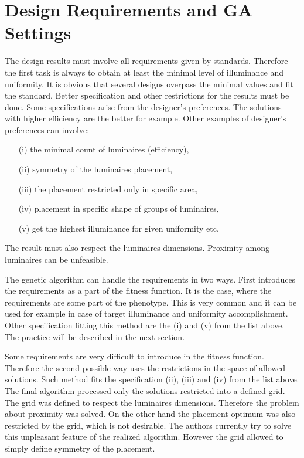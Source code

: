 \section{Design Requirements and GA Settings}
The design results must involve all requirements given by standards. Therefore the first task is always to obtain at least the minimal level of illuminance and uniformity. It is obvious that several designs overpass the minimal values and fit the standard. Better specification and other restrictions for the results must be done. Some specifications arise from the designer's preferences. The solutions with higher efficiency are the better for example. Other examples of designer's preferences can involve:

\begin{enumerate}
	\item[(i)] the minimal count of luminaires (efficiency),
	\item[(ii)] symmetry of the luminaires placement,
	\item[(iii)] the placement restricted only in specific area,
	\item[(iv)] placement in specific shape of groups of luminaires,
	\item[(v)] get the highest illuminance for given uniformity etc.
\end{enumerate}

The result must also respect the luminaires dimensions. Proximity among luminaires can be unfeasible.

The genetic algorithm can handle the requirements in two ways. First introduces the requirements as a part of the fitness function. It is the case, where the requirements are some part of the phenotype. This is very common and it can be used for example in case of target illuminance and uniformity accomplishment. Other specification fitting this method are the (i) and (v) from the list above. The practice will be described in the next section. 

Some requirements are very difficult to introduce in the fitness function. Therefore the second possible way uses the restrictions in the space of allowed solutions. Such method fits the specification (ii), (iii) and (iv) from the list above. The final algorithm processed only the solutions restricted into a defined grid. The grid was defined to respect the luminaires dimensions. Therefore the problem about proximity was solved. On the other hand the placement optimum was also restricted by the grid, which is not desirable. The authors currently try to solve this unpleasant feature of the realized algorithm. However the grid allowed to simply define symmetry of the placement.

